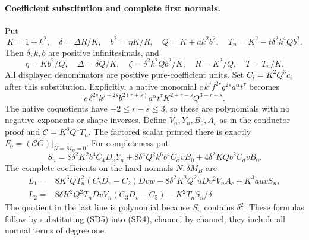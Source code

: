 \paragraph{Coefficient substitution and complete first normals.}
Put
\[
 K=1+k^2,\quad \delta=\Delta R/K,\quad b^2=\eta K/R,
 \quad Q=K+ak^2b^2,\quad T_n=K^2-t\delta^2k^4Qb^2.
\]
Then $\delta,k,b$ are positive infinitesimals, and
\[
 \eta=Kb^2/Q,\quad \Delta=\delta Q/K,\quad
 \zeta=\delta^2k^2Qb^2/K,\quad R=K^2/Q,\quad T=T_n/K.     \tag{SD6}
\]
All displayed denominators are positive pure-coefficient units.
Set $C_i=K^2Q^3c_i$ after this substitution. Explicitly, a native monomial
$c\,k^jf^{2r}g^{2s}a^\alpha t^\tau$ becomes
\[
 c\,\delta^{2s}k^{j+2s}b^{2(r+s)}a^\alpha t^\tau
       K^{2+r-s}Q^{3-r+s}.                            \tag{SD7}
\]
The native coquotients have $-2\le r-s\le3$, so these are polynomials
with no negative exponents or shape inverses.
Define $V_n,Y_n,B_0,A_c$ as in the conductor proof and
$\mathcal C=K^6Q^4T_n$. The factored scalar printed there is exactly
$F_0=(\mathcal CG)|_{N=M_B=0}$. For completeness put
\[
 S_n=8\delta^2K^2b^4C_4D_vY_n
 +8\delta^4Q^2k^6b^4C_\alpha vB_0
 +4\delta^2KQb^2C_dvB_0.
\]
The complete coefficients on the hard normals $N,\delta M_B$ are
\begin{align*}
 L_1={}&8K^3QT_n^2(C_bD_v-C_2)Dvw
       -8\delta^2K^2Q^2uD v^2V_nA_c+K^3auvS_n,\\
 L_2={}&8\delta K^2Q^2T_nD vV_n(C_3D_v-C_5)-K^2T_nS_n/\delta.
                                                               \tag{SD8}
\end{align*}
The quotient in the last line is polynomial because $S_n$ contains
$\delta^2$. These formulas follow by substituting (SD5) into (SD4),
channel by channel; they include all normal terms of degree one.

